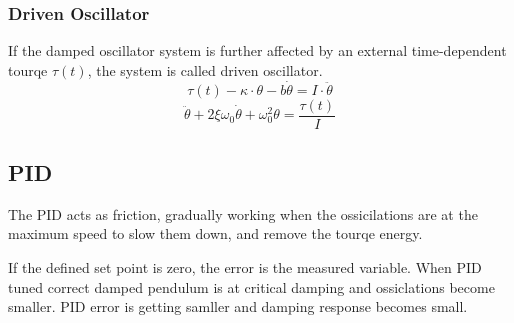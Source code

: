 \documentclass[\main/master.tex]{subfiles}
\begin{document}
\subsubsection{Driven Oscillator}
If the damped oscillator system is further affected by an external time-dependent tourqe $\tau(t)$,  the system is called driven oscillator.
\begin{equation}
\tau(t) -\kappa\cdot\theta - b\dot{\theta}  = I\cdot\ddot{\theta}   \label{eqn:driven_motion_equation}
\end{equation} 
\begin{equation}
\ddot{\theta} + 2\xi\omega_0\dot{\theta} + \omega_0^2\theta = \frac{\tau(t)}{I}   \label{eqn:damped_motion_equation}
\end{equation}

\newpage
\subsection{PID}
The PID acts as friction, gradually working when the ossicilations are at the maximum speed to slow them down, and remove the tourqe energy.
\par
If the defined set point is zero, the error is the measured variable. When PID tuned correct damped pendulum is at critical damping and ossiclations become smaller. PID error is getting samller and damping response becomes small. 
\end{document}
